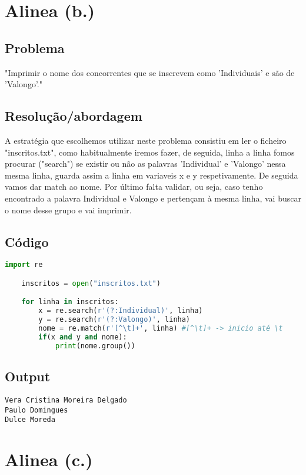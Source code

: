 \documentclass[11pt,a4paper]{report}
\begin{document}
\section{Alinea (b.)}
	\subsection{Problema}
	"Imprimir o nome dos concorrentes que se inscrevem como 'Individuais' e são de 'Valongo'."
	
	\subsection{Resolução/abordagem}
	
	A estratégia que escolhemos utilizar neste problema consistiu em ler o ficheiro "inscritos.txt", como habitualmente iremos fazer, de seguida, linha a linha fomos procurar ("search") se existir ou não as palavras 'Individual' e 'Valongo' nessa mesma linha, guarda assim a linha em variaveis x e y respetivamente. De seguida vamos dar match ao nome.
	Por último falta validar, ou seja, caso tenho encontrado a palavra Individual e Valongo e pertençam à mesma linha, vai buscar o nome desse grupo e vai imprimir.
    
	
	\subsection{Código}
	\begin{lstlisting}[language=python]
    import re

    inscritos = open("inscritos.txt")

    for linha in inscritos:
        x = re.search(r'(?:Individual)', linha)
        y = re.search(r'(?:Valongo)', linha)
        nome = re.match(r'[^\t]+', linha) #[^\t]+ -> inicio até \t
        if(x and y and nome):
            print(nome.group())
    \end{lstlisting}
    
    \subsection{Output}

	\begin{verbatim}
Vera Cristina Moreira Delgado
Paulo Domingues
Dulce Moreda	
    \end{verbatim}

\pagebreak

    \section{Alinea (c.)}
\end{document}
